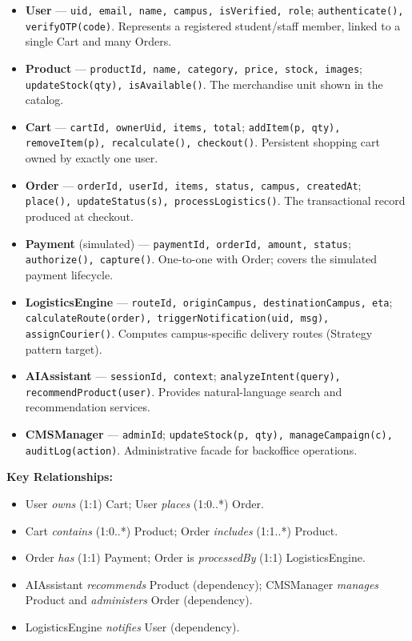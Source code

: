 \documentclass[11pt,a4paper]{article}
\begin{document}
\begin{itemize}
    \item \textbf{User} --- \texttt{uid, email, name, campus, isVerified, role}; \texttt{authenticate(), verifyOTP(code)}. Represents a registered student/staff member, linked to a single Cart and many Orders.
    \item \textbf{Product} --- \texttt{productId, name, category, price, stock, images}; \texttt{updateStock(qty), isAvailable()}. The merchandise unit shown in the catalog.
    \item \textbf{Cart} --- \texttt{cartId, ownerUid, items, total}; \texttt{addItem(p, qty), removeItem(p), recalculate(), checkout()}. Persistent shopping cart owned by exactly one user.
    \item \textbf{Order} --- \texttt{orderId, userId, items, status, campus, createdAt}; \texttt{place(), updateStatus(s), processLogistics()}. The transactional record produced at checkout.
    \item \textbf{Payment} (simulated) --- \texttt{paymentId, orderId, amount, status}; \texttt{authorize(), capture()}. One-to-one with Order; covers the simulated payment lifecycle.
    \item \textbf{LogisticsEngine} --- \texttt{routeId, originCampus, destinationCampus, eta}; \texttt{calculateRoute(order), triggerNotification(uid, msg), assignCourier()}. Computes campus-specific delivery routes (Strategy pattern target).
    \item \textbf{AIAssistant} --- \texttt{sessionId, context}; \texttt{analyzeIntent(query), recommendProduct(user)}. Provides natural-language search and recommendation services.
    \item \textbf{CMSManager} --- \texttt{adminId}; \texttt{updateStock(p, qty), manageCampaign(c), auditLog(action)}. Administrative facade for backoffice operations.
\end{itemize}
 
\noindent\textbf{Key Relationships:}
\begin{itemize}
    \item User \textit{owns} (1:1) Cart; User \textit{places} (1:0..*) Order.
    \item Cart \textit{contains} (1:0..*) Product; Order \textit{includes} (1:1..*) Product.
    \item Order \textit{has} (1:1) Payment; Order is \textit{processedBy} (1:1) LogisticsEngine.
    \item AIAssistant \textit{recommends} Product (dependency); CMSManager \textit{manages} Product and \textit{administers} Order (dependency).
    \item LogisticsEngine \textit{notifies} User (dependency).
\end{itemize}
 
\end{document}
